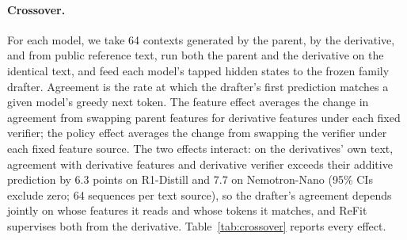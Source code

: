 \documentclass[11pt]{article}
\newcommand{\refit}{ReFit}
\begin{document}
\paragraph{Crossover.}
For each model, we take 64 contexts generated by the parent, by the derivative, and from public reference text, run both the parent and the derivative on the identical text, and feed each model's tapped hidden states to the frozen family drafter.
Agreement is the rate at which the drafter's first prediction matches a given model's greedy next token.
The feature effect averages the change in agreement from swapping parent features for derivative features under each fixed verifier; the policy effect averages the change from swapping the verifier under each fixed feature source.
The two effects interact: on the derivatives' own text, agreement with derivative features and derivative verifier exceeds their additive prediction by 6.3 points on R1-Distill and 7.7 on Nemotron-Nano (95\% CIs exclude zero; 64 sequences per text source), so the drafter's agreement depends jointly on whose features it reads and whose tokens it matches, and \refit{} supervises both from the derivative.
Table~\ref{tab:crossover} reports every effect.
\end{document}
